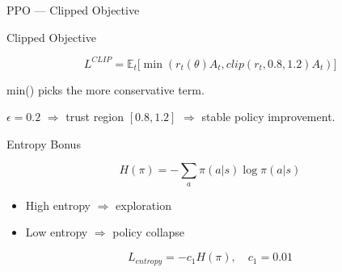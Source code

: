 \documentclass[10pt, aspectratio=169]{beamer}
\begin{document}
\begin{frame}[t]{PPO --- Clipped Objective}

\footnotesize

\begin{block}{Clipped Objective}

\[
L^{CLIP} =
\mathbb{E}_t
\Big[
\min(
r_t(\theta)A_t,
clip(r_t,0.8,1.2)A_t
)
\Big]
\]

\smallskip

min() picks the \alert{more conservative} term.

\smallskip

$\epsilon=0.2$ $\Rightarrow$ trust region $[0.8,1.2]$  
$\Rightarrow$ stable policy improvement.

\end{block}

\vspace{0.15cm}

\begin{exampleblock}{Entropy Bonus}

\[
H(\pi)=-\sum_a \pi(a|s)\log\pi(a|s)
\]

\vspace{0.15cm}

\begin{itemize}
\item High entropy $\Rightarrow$ exploration
\item Low entropy $\Rightarrow$ policy collapse
\end{itemize}

\vspace{0.1cm}

\[
L_{entropy}=-c_1H(\pi), \quad c_1=0.01
\]

\end{exampleblock}

\end{frame}


\end{document}

